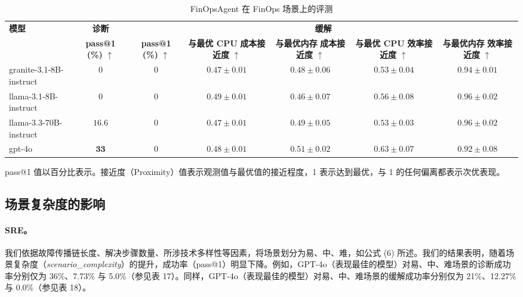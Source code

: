 \documentclass[10pt,UTF8,fontset=fandol]{ctexart}
\begin{document}
\begin{table}[H]
\centering
\caption{FinOpsAgent 在 FinOps 场景上的评测}
\label{tab:itb-finops}
\begin{adjustbox}{max width=\linewidth}
\begin{tabular}{lc ccccc}
\toprule
\multirow{2}{*}{\textbf{模型}} & \textbf{诊断} & \multicolumn{5}{c}{\textbf{缓解}} \\
\cmidrule(lr){2-2} \cmidrule(lr){3-7}
 & \textbf{pass@1 (\%)} $\uparrow$ & \textbf{pass@1 (\%)} $\uparrow$ & \makecell{\textbf{与最优 CPU}\\\textbf{成本接近度} $\uparrow$} & \makecell{\textbf{与最优内存}\\\textbf{成本接近度} $\uparrow$} & \makecell{\textbf{与最优 CPU}\\\textbf{效率接近度} $\uparrow$} & \makecell{\textbf{与最优内存}\\\textbf{效率接近度} $\uparrow$} \\
\midrule
granite-3.1-8B-instruct & $0$ & $0$ & $0.47 \pm 0.01$ & $0.48 \pm 0.06$ & $0.53 \pm 0.04$ & $0.94 \pm 0.01$ \\
llama-3.1-8B-instruct & $0$ & $0$ & $\mathbf{0.49 \pm 0.01}$ & $0.46 \pm 0.07$ & $0.56 \pm 0.08$ & $0.96 \pm 0.02$ \\
llama-3.3-70B-instruct & $16.6$ & $0$ & $0.47 \pm 0.01$ & $0.49 \pm 0.05$ & $0.53 \pm 0.03$ & $0.96 \pm 0.02$ \\
gpt-4o & $\mathbf{33}$ & $0$ & $0.48 \pm 0.01$ & $\mathbf{0.51 \pm 0.02}$ & $\mathbf{0.63 \pm 0.07}$ & $0.92 \pm 0.08$ \\
\bottomrule
\end{tabular}
\end{adjustbox}

{\footnotesize
\noindent pass@1 值以百分比表示。接近度（Proximity）值表示观测值与最优值的接近程度，1 表示达到最优，与 1 的任何偏离都表示次优表现。
\par}
\end{table}

\subsection{场景复杂度的影响}

\paragraph{SRE。} 我们依据故障传播链长度、解决步骤数量、所涉技术多样性等因素，将场景划分为易、中、难，如公式 (6) 所述。我们的结果表明，随着场景复杂度（\textit{scenario\_complexity}）的提升，成功率（pass@1）明显下降。例如，GPT-4o（表现最佳的模型）对易、中、难场景的诊断成功率分别仅为 36\%、7.73\% 与 5.0\%（参见表 17）。同样，GPT-4o（表现最佳的模型）对易、中、难场景的缓解成功率分别仅为 21\%、12.27\% 与 0.0\%（参见表 18）。
\end{document}
